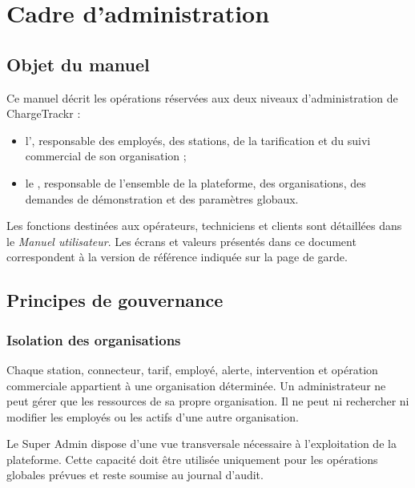 \chapter{Cadre d'administration}

\section{Objet du manuel}

Ce manuel décrit les opérations réservées aux deux niveaux d'administration de
ChargeTrackr :

\begin{itemize}[leftmargin=*]
  \item l', responsable des employés,
  des stations, de la tarification et du suivi commercial de son organisation ;
  \item le , responsable de l'ensemble de la plateforme,
  des organisations, des demandes de démonstration et des paramètres globaux.
\end{itemize}

Les fonctions destinées aux opérateurs, techniciens et clients sont détaillées
dans le \emph{Manuel utilisateur}. Les écrans et valeurs présentés dans ce
document correspondent à la version de référence indiquée sur la page de garde.

\section{Principes de gouvernance}

\subsection{Isolation des organisations}

Chaque station, connecteur, tarif, employé, alerte, intervention et opération
commerciale appartient à une organisation déterminée. Un administrateur ne
peut gérer que les ressources de sa propre organisation. Il ne peut ni
rechercher ni modifier les employés ou les actifs d'une autre organisation.

Le Super Admin dispose d'une vue transversale nécessaire à l'exploitation de la
plateforme. Cette capacité doit être utilisée uniquement pour les opérations
globales prévues et reste soumise au journal d'audit.


